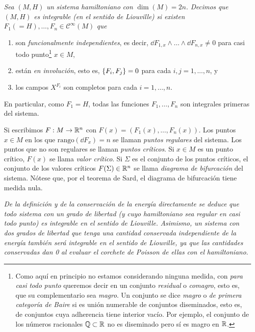 \begin{defn}
  \em
  Sea $(M,H)$ un sistema hamiltoniano con $\dim(M)=2n$. Decimos que $(M,H)$ es \emph{integrable (en el sentido de Liouville)} si existen $F_1(=H),\dots,F_n\in \mathscr{C}^{\infty}(M)$ que
\begin{enumerate}
  \item son \emph{funcionalmente independientes}, es decir, $\dd F_{1,x}\wedge \dots \wedge \dd F_{n,x}\neq 0$ para casi todo punto\footnote{Como aquí en principio no estamos considerando ninguna medida, con \emph{para casi todo punto} queremos decir en un conjunto \emph{residual} o \emph{comagro}, esto es, que su complementario sea \emph{magro}. Un conjunto se dice \emph{magro} o \emph{de primera categoría de Baire} si es unión numerable de conjuntos diseminados, esto es, de conjuntos cuya adherencia tiene interior vacío. Por ejemplo, el conjunto de los números racionales $\mathbb{Q}\subset\mathbb{R}$ no es diseminado pero sí es magro en $\mathbb{R}$. } $x\in M$, 
  \item están \emph{en involución}, esto es, $\left\lbrace F_i,F_j\right\rbrace=0$ para cada $i,j=1,\dots,n$, y
  \item  los campos $X^{F_i}$ son completos para cada $i=1,\dots,n$. 
\end{enumerate}
En particular, como $F_1=H$, todas las funciones $F_1,\dots,F_n$ son integrales primeras del sistema.

Si escribimos $F:M\rightarrow \mathbb{R}^n$ con $F(x)=(F_1(x),\dots,F_n(x))$. Los puntos $x\in M$ en los que $\mathrm{rango} (\dd F_x) =n$ se llaman \emph{puntos regulares} del sistema. Los puntos que no son regulares se llaman \emph{puntos críticos}. Si $x\in M$ es un punto crítico, $F(x)$ se llama \emph{valor crítico}. Si $\Sigma$ es el conjunto de los puntos críticos, el conjunto de los valores críticos $F(\Sigma)\in \mathbb{R}^n$ se llama \emph{diagrama de bifurcación} del sistema.
 Nótese que, por el teorema de Sard, el diagrama de bifurcación tiene medida nula.
\end{defn}

\begin{obs}
  \em
  De la definición y de la conservación de la energía directamente se deduce que todo sistema con un grado de libertad (y cuyo hamiltoniano sea regular en casi todo punto) es integrable en el sentido de Liouville. Asimismo, un sistema con dos grados de libertad que tenga una cantidad conservada independiente de la energía también será integrable en el sentido de Liouville, ya que las cantidades conservadas dan 0 al evaluar el corchete de Poisson de ellas con el hamiltoniano.
\end{obs}

